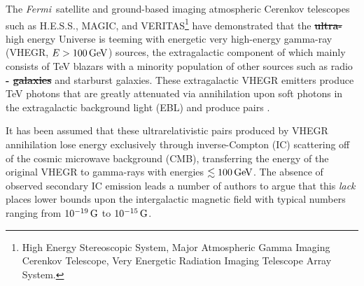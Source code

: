 \documentclass[usenatbib,iop,apj,numberedappendix]{aeb_emulateapj_2015}
\newcommand\cp[1]{{\color{blue} \bf #1}} %
\def\eV{{\rm eV}} %
\def\GeV{{\rm G}\eV} %
\def\G{{\rm G}}
\def\Fermi{{\em Fermi\ }}
\begin{document}



The \Fermi satellite and ground-based imaging atmospheric Cerenkov telescopes such as
H.E.S.S., MAGIC, and VERITAS\footnote{High Energy
  Stereoscopic System, Major Atmospheric Gamma Imaging Cerenkov Telescope, Very
  Energetic Radiation Imaging Telescope Array System.} have demonstrated that the \cp{\sout{ultra-}}high
energy Universe is teeming with energetic very high-energy gamma-ray 
(VHEGR, $E > 100\,\GeV$) sources, the extragalactic component of which mainly consists of TeV
blazars with a minority population of other sources  such as radio\cp{- \sout{galaxies}}
and starburst galaxies. These extragalactic VHEGR emitters produce TeV photons that are greatly attenuated via annihilation upon soft photons in the extragalactic background light
(EBL) and produce pairs \citep[see, e.g.,][]{Goul-Schr:67,Sala-Stec:98,Nero-Semi:09}.

It has been assumed that these ultrarelativistic pairs produced by VHEGR annihilation 
lose energy exclusively through inverse-Compton (IC) scattering off of the cosmic microwave
background (CMB),   transferring the energy of the original VHEGR to gamma-rays with
energies $\lesssim100\,\GeV$.  The absence of observed secondary IC emission leads a number of
authors to argue that this \textit{lack} places lower bounds upon the
intergalactic magnetic field
\citep[IGMF; see, e.g.,][]{Nero-Vovk:10,Tave_etal:10a,Tave_etal:10b,Derm_etal:10,Tayl-Vovk-Nero:11,Taka_etal:11,Dola_etal:11} with 
typical numbers ranging from $10^{-19}\,\G$ to $10^{-15}\,\G$.  
\end{document}
